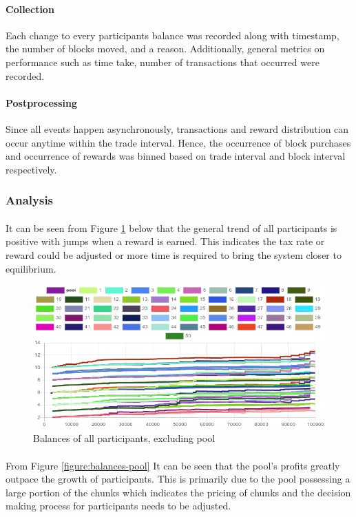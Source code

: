 \paragraph{Collection} Each change to every participants balance was recorded along with timestamp, the number of blocks moved, and a reason. Additionally, general metrics on performance such as time take, number of transactions that occurred were recorded.

\paragraph{Postprocessing} Since all events happen asynchronously, transactions and reward distribution can occur anytime within the trade interval. Hence, the occurrence of block purchases and occurrence of rewards was binned based on trade interval and block interval respectively.

\subsubsection{Analysis}

\paragraph{} It can be seen from Figure \ref{figure:balances} below that the general trend of all participants is positive with jumps when a reward is earned. This indicates the tax rate or reward could be adjusted or more time is required to bring the system closer to equilibrium.

\begin{figure}[H]
  \centering
  \caption{Balances of all participants, excluding pool}
  \label{figure:balances}
  \includegraphics[width=\linewidth]{media/fig-balances}
\end{figure}

\paragraph{} From Figure \ref{figure:balances-pool} It can be seen that the pool's profits greatly outpace the growth of participants. This is primarily due to the pool possessing a large portion of the chunks which indicates the pricing of chunks and the decision making process for participants needs to be adjusted.


